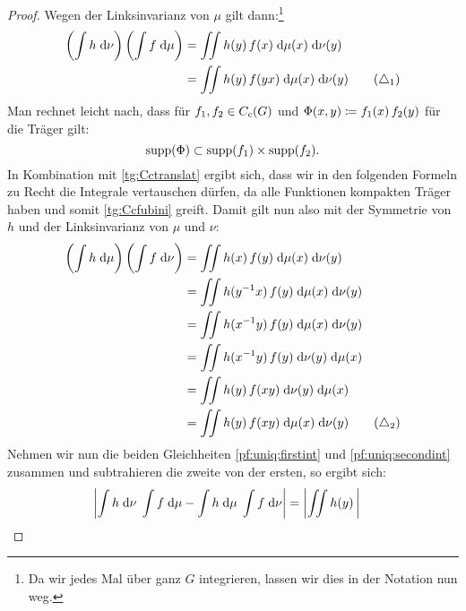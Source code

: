\begin{proof}
    Wegen der Linksinvarianz von $\mu$ gilt dann:\footnote{Da wir jedes Mal über ganz
    $G$ integrieren, lassen wir dies in der Notation nun weg.}
    \begin{align*}
        \left( \int h \dif\nu \right) \left( \int f \dif\mu \right)     %
        &= \iint h(y) \, f(x) \dif{\mu(x)} \dif{\nu(y)}                 \\
        &= \iint h(y) \, f(yx) \dif{\mu(x)} \dif{\nu(y)}                %
        \label{pf:uniq:firstint} \tag{$\triangle_1$}
    \end{align*}
    Man rechnet leicht nach, dass für $f_1,f_2\in C_c(G)$ und
    $\Phi(x,y)\coloneqq f_1(x)\,f_2(y)$ für die Träger gilt: 
    \[ \operatorname{supp}(\Phi) \subset \operatorname{supp}(f_1) \times \operatorname{supp}(f_2)
    . \]
    In Kombination mit \cref{tg:Cctranslat} ergibt sich, dass wir in den
    folgenden Formeln zu Recht die Integrale vertauschen dürfen, da alle
    Funktionen kompakten Träger haben und somit \cref{tg:Ccfubini} greift.
    Damit gilt nun also mit der Symmetrie von~$h$ und der Linksinvarianz von
    $\mu$ und $\nu$:
    \begin{align*} 
        \left( \int h \dif\mu \right) \left( \int f \dif\nu \right)     %
        &= \iint h(x) \, f(y) \dif{\mu(x)} \dif{\nu(y)}                 \\
        &= \iint h(y^{-1}x) \, f(y) \dif{\mu(x)} \dif{\nu(y)}           \\
        &= \iint h(x^{-1}y) \, f(y) \dif{\mu(x)} \dif{\nu(y)}           \\
        &= \iint h(x^{-1}y) \, f(y) \dif{\nu(y)} \dif{\mu(x)}           \\
        &= \iint h(y) \, f(xy) \dif{\nu(y)} \dif{\mu(x)}                \\
        &= \iint h(y) \, f(xy) \dif{\mu(x)} \dif{\nu(y)}                %
        \label{pf:uniq:secondint} \tag{$\triangle_2$}
    \end{align*}
    Nehmen wir nun die beiden Gleichheiten \eqref{pf:uniq:firstint} und 
    \eqref{pf:uniq:secondint} zusammen und subtrahieren die zweite von der
    ersten, so ergibt sich:
    \begin{align*}
        \abs*{                                                              %
                \int h \dif\nu \; \int f \dif\mu                            %
            -   \int h \dif\mu \; \int f \dif\nu                            %
        }                                                                   %
        &= \abs*{ \iint h(y) \,                                             %
}
\end{align*}
\end{proof}
